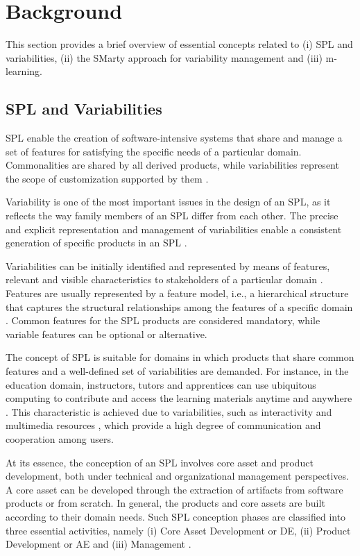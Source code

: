 \section{Background}\label{section2}

This section provides a brief overview of essential concepts related to (i) SPL and variabilities, (ii) the SMarty approach for variability management and (iii) m-learning.

\subsection{SPL and Variabilities}

SPL enable the creation of software-intensive systems that share and manage a set of features for satisfying the specific needs of a particular domain. Commonalities are shared by all derived products, while variabilities represent the scope of customization supported by them \cite{bockle05,vanderlinden07}.

Variability is one of the most important issues in the design of an SPL, as it reflects the way family members of an SPL differ from each other. The precise and explicit representation and management of variabilities enable a consistent generation of specific products in an SPL \cite{chen11,capilla13}. 

Variabilities can be initially identified and represented by means of features, relevant and visible characteristics to stakeholders of a particular domain \cite{bosch01}. Features are usually represented by a feature model, i.e., a hierarchical structure that captures the structural relationships among the features of a specific domain \cite{bockle05,vanderlinden07}. Common features for the SPL products are considered mandatory, while variable features can be optional or alternative.


The concept of SPL is suitable for domains in which products that share common features and a well-defined set of variabilities are demanded. For instance, in the education domain, instructors, tutors and apprentices can use ubiquitous computing to contribute and access the learning materials anytime and anywhere \cite{kukulska05}. This characteristic is achieved due to variabilities, such as interactivity and multimedia resources \cite{falvojr14a,falvojr14b}, which provide a high degree of communication and cooperation among users.

At its essence, the conception of an SPL involves core asset and product development, both under technical and organizational management perspectives. A core asset can be developed through the extraction of artifacts from software products or from scratch. In general, the products and core assets are built according to their domain needs. Such SPL conception phases are classified into three essential activities, namely (i) Core Asset Development or DE, (ii) Product Development or AE and (iii) Management \cite{bockle05,vanderlinden07}.

